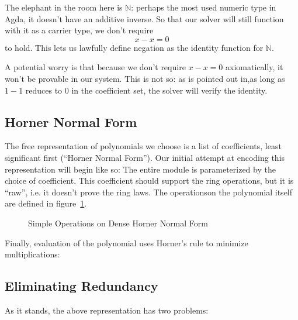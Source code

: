 \documentclass[draft, twocolumn]{article}
\theoremstyle{definition}
\theoremstyle{definition}
\begin{document}
The elephant in the room here is \(\mathbb{N}\): perhaps the most used numeric
type in Agda, it doesn't have an additive inverse. So that our solver will still
function with it as a carrier type, we don't require
\[x - x = 0\]
to hold. This lets us lawfully define negation as the identity function for
\(\mathbb{N}\).

A potential worry is that because we don't require \(x - x = 0\)
axiomatically, it won't be provable in our system. This is not so: as is pointed
out in\cite{gregoire_proving_2005},as long as \(1 - 1\) reduces to \(0\) in the
coefficient set, the solver will verify the identity.
\subsection{Horner Normal Form}
The free representation of polynomials we choose is a list of coefficients,
least significant first (``Horner Normal Form''). Our initial attempt at
encoding this representation will begin like so:
The entire module is parameterized by the choice of coefficient. This
coefficient should support the ring operations, but it is ``raw'', i.e. it
doesn't prove the ring laws. The operations\footnotemark on the polynomial
itself are defined in figure~\ref{simple-ops}.

\begin{figure}
  \caption{
    Simple Operations on Dense Horner Normal Form}
  \label{simple-ops}
\end{figure}
Finally, evaluation of the polynomial uses Horner's rule to minimize
multiplications:
\subsection{Eliminating Redundancy}
As it stands, the above representation has two problems:
\end{document}
